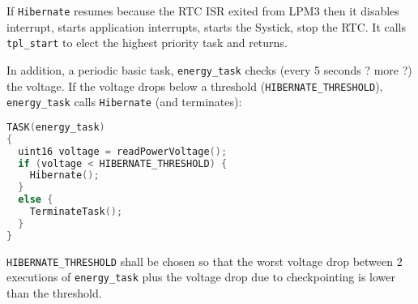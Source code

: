 \documentclass[11pt, oneside]{article}   	%
\begin{document}
If \lstinline{Hibernate} resumes because the RTC ISR exited from LPM3 then it disables interrupt, starts application interrupts, starts the Systick, stop the RTC. It calls \lstinline{tpl_start} to elect the highest priority task and returns.

In addition, a periodic basic task, \lstinline{energy_task} checks (every 5 seconds ? more ?) the voltage. If the voltage drops below a threshold (\lstinline{HIBERNATE_THRESHOLD}), \lstinline{energy_task} calls \lstinline{Hibernate} (and terminates):

\begin{lstlisting}[language=C]
TASK(energy_task)
{
  uint16 voltage = readPowerVoltage();
  if (voltage < HIBERNATE_THRESHOLD) {
    Hibernate();
  }
  else {
    TerminateTask();
  }
}
\end{lstlisting}

\lstinline{HIBERNATE_THRESHOLD} shall be chosen so that the worst voltage drop between 2 executions of \lstinline{energy_task} plus the voltage drop due to checkpointing is lower than the threshold.
\end{document}
